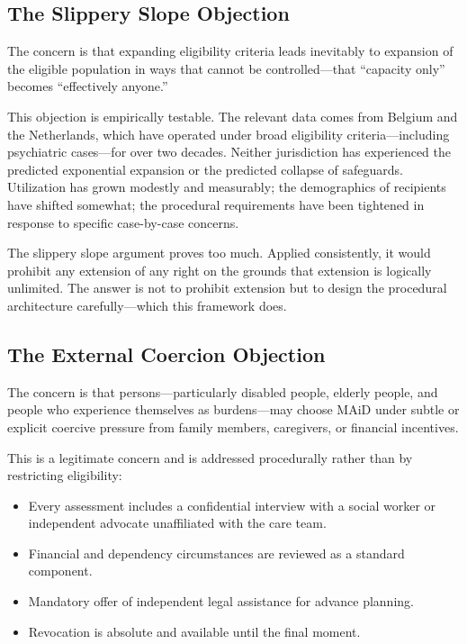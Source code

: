 \documentclass[11pt, letterpaper]{article}
\begin{document}
\subsection{The Slippery Slope Objection}

The concern is that expanding eligibility criteria leads inevitably to expansion of the
eligible population in ways that cannot be controlled---that ``capacity only'' becomes
``effectively anyone.''

This objection is empirically testable. The relevant data comes from Belgium and the
Netherlands, which have operated under broad eligibility criteria---including psychiatric
cases---for over two decades. Neither jurisdiction has experienced the predicted exponential
expansion or the predicted collapse of safeguards. Utilization has grown modestly and
measurably; the demographics of recipients have shifted somewhat; the procedural requirements
have been tightened in response to specific case-by-case concerns.

The slippery slope argument proves too much. Applied consistently, it would prohibit any
extension of any right on the grounds that extension is logically unlimited. The answer is
not to prohibit extension but to design the procedural architecture carefully---which this
framework does.

\subsection{The External Coercion Objection}

The concern is that persons---particularly disabled people, elderly people, and people who
experience themselves as burdens---may choose MAiD under subtle or explicit coercive pressure
from family members, caregivers, or financial incentives.

This is a legitimate concern and is addressed procedurally rather than by restricting
eligibility:

\begin{itemize}
  \item Every assessment includes a confidential interview with a social worker or independent
    advocate unaffiliated with the care team.
  \item Financial and dependency circumstances are reviewed as a standard component.
  \item Mandatory offer of independent legal assistance for advance planning.
  \item Revocation is absolute and available until the final moment.
\end{itemize}
\end{document}
